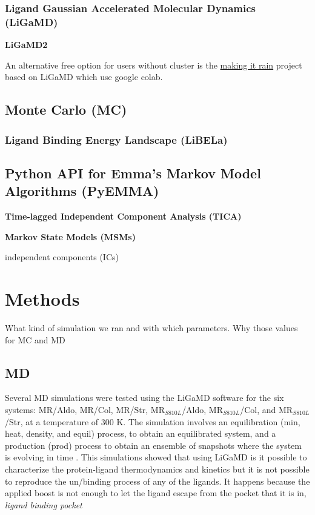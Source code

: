 \documentclass[letter,10pt, twocolumn]{article}
\begin{document}
\subsubsection*{\textbf{Ligand Gaussian Accelerated Molecular Dynamics (LiGaMD)}}


\textbf{LiGaMD2} 

\cite{ligamd_Miao, ligamd2}

An alternative free option for users without cluster is the \href{https://github.com/pablo-arantes/making-it-rain}{making it rain} project based on LiGaMD which use google colab. \cite{making_it_rain}

\subsection{Monte Carlo (MC)}


\subsubsection*{\textbf{Ligand Binding Energy Landscape  (LiBELa)}}
\cite{libela}

\subsection{\textbf{Python API for Emma's Markov Model Algorithms (PyEMMA)}}

\textbf{Time-lagged Independent Component
Analysis (TICA)}

\textbf{Markov State Models (MSMs)}

independent components (ICs)

\cite{pyemma}


\section{Methods}

What kind of simulation we ran and with which parameters. Why those values for MC and MD

\subsection*{MD}

Several MD simulations were tested using the LiGaMD software for the six systems: MR/Aldo, MR/Col, MR/Str, MR$_{S810L}$/Aldo, MR$_{S810L}$/Col, and MR$_{S810L}$/Str, at a temperature of 300 K. The simulation involves an equilibration (min, heat, density, and equil) process, to obtain an equilibrated system, and a production (prod) process to obtain an ensemble of snapshots where the system is evolving in time \cite{amber}. This simulations showed that using LiGaMD is it possible to characterize the protein-ligand thermodynamics and kinetics but it is not possible to reproduce the un/binding process of any of the ligands.
It happens because the applied boost is not enough to let the ligand escape from the pocket that it is in, \textit{ligand binding pocket}	
\end{document}
